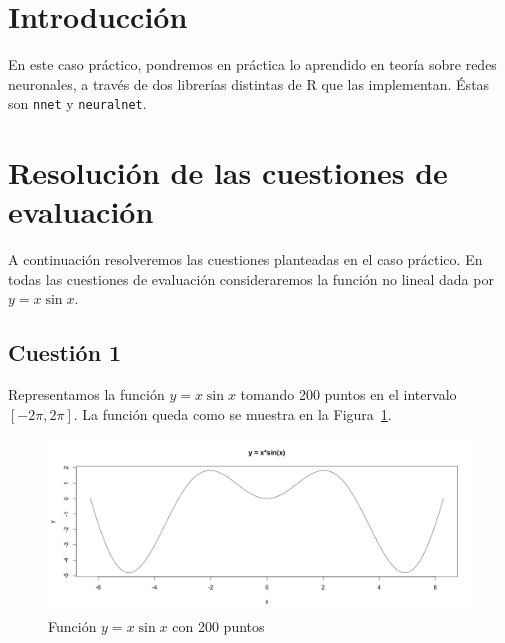 \documentclass[12pt,a4paper,twoside,openright,titlepage,final]{article}
\author{José Ignacio Escribano}
\title{}
\begin{document}
\setcounter{page}{1}


\listoffigures
\thispagestyle{empty}
\newpage

\listoftables
\thispagestyle{empty}
\newpage

\tableofcontents
\thispagestyle{empty}
\newpage


\setcounter{page}{1}

\section{Introducción}

En este caso práctico, pondremos en práctica lo aprendido en teoría sobre redes neuronales, a través de dos librerías distintas de R que las implementan. Éstas son \texttt{nnet} y \texttt{neuralnet}.

\section{Resolución de las cuestiones de evaluación}

A continuación resolveremos las cuestiones planteadas en el caso práctico. En todas las cuestiones de evaluación consideraremos la función no lineal dada por $y = x \sin x$.

\subsection{Cuestión 1}
Representamos la función $y = x \sin x$ tomando 200 puntos en el intervalo $[-2\pi, 2\pi]$. La función queda como se muestra en la Figura~\ref{fig:funcion_con_type}.\\

\begin{figure}[tbph!]
\centering
\includegraphics[width=0.8\linewidth]{imagenes/funcion_con_type}
\caption{Función $y = x\sin x$ con 200 puntos}
\label{fig:funcion_con_type}
\end{figure}
\end{document}
